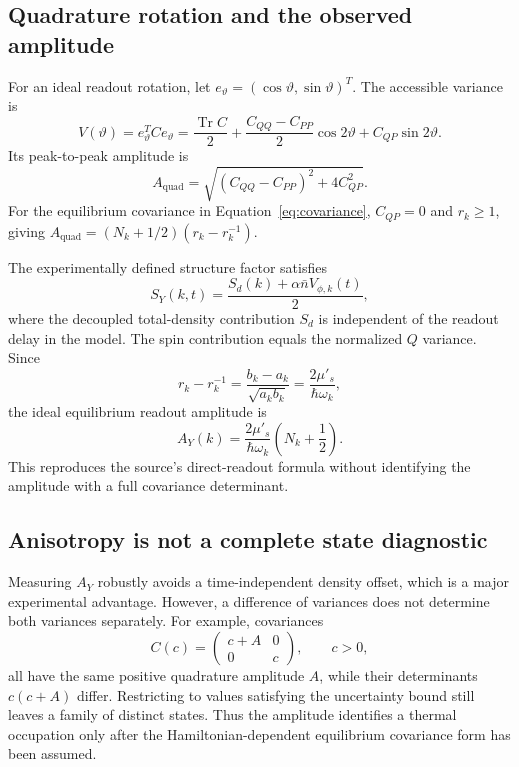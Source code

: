 \documentclass[11pt,a4paper]{article}
\theoremstyle{definition}
\theoremstyle{remark}
\newcommand{\Tr}{\operatorname{Tr}}
\newcommand{\musp}{\mu'_s}
\newcommand{\nb}{\bar n}
\begin{document}
\subsection{Quadrature rotation and the observed amplitude}
For an ideal readout rotation, let $e_\vartheta=(\cos\vartheta,\sin\vartheta)^T$. The accessible variance is
\begin{equation}
 V(\vartheta)=e_\vartheta^TCe_\vartheta
 =\frac{\Tr C}{2}
 +\frac{C_{QQ}-C_{PP}}{2}\cos2\vartheta
 +C_{QP}\sin2\vartheta.
 \label{eq:tomography}
\end{equation}
Its peak-to-peak amplitude is
\begin{equation}
 A_{\mathrm{quad}}
 =\sqrt{(C_{QQ}-C_{PP})^2+4C_{QP}^2}.
 \label{eq:general_amplitude}
\end{equation}
For the equilibrium covariance in Equation~\eqref{eq:covariance}, $C_{QP}=0$ and $r_k\geq1$, giving $A_{\mathrm{quad}}=(N_k+1/2)(r_k-r_k^{-1})$.

The experimentally defined structure factor satisfies
\begin{equation}
 S_Y(k,t)=\frac{S_d(k)+\alpha\nb V_{\phi,k}(t)}{2},
 \label{eq:SY}
\end{equation}
where the decoupled total-density contribution $S_d$ is independent of the readout delay in the model. The spin contribution equals the normalized $Q$ variance. Since
\begin{equation}
 r_k-r_k^{-1}=\frac{b_k-a_k}{\sqrt{a_kb_k}}
 =\frac{2\musp}{\hbar\omega_k},
 \label{eq:anisotropy_identity}
\end{equation}
the ideal equilibrium readout amplitude is
\begin{equation}
 A_Y(k)=\frac{2\musp}{\hbar\omega_k}\left(N_k+\frac12\right).
 \label{eq:AY}
\end{equation}
This reproduces the source's direct-readout formula without identifying the amplitude with a full covariance determinant.\cite{zhang2026}

\subsection{Anisotropy is not a complete state diagnostic}
Measuring $A_Y$ robustly avoids a time-independent density offset, which is a major experimental advantage. However, a difference of variances does not determine both variances separately. For example, covariances
\begin{equation}
 C(c)=\begin{pmatrix}c+A&0\\0&c\end{pmatrix},\qquad c>0,
 \label{eq:ambiguity_cov}
\end{equation}
all have the same positive quadrature amplitude $A$, while their determinants $c(c+A)$ differ. Restricting to values satisfying the uncertainty bound still leaves a family of distinct states. Thus the amplitude identifies a thermal occupation only after the Hamiltonian-dependent equilibrium covariance form has been assumed.
\end{document}
